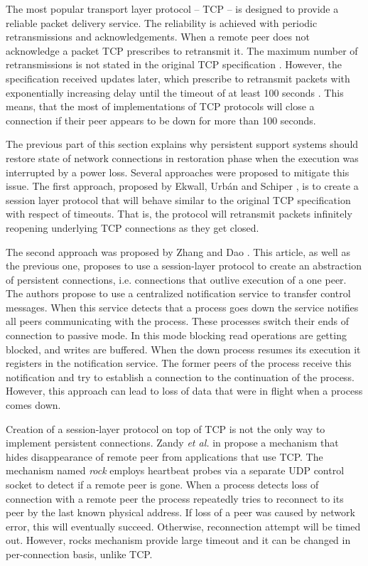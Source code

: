 The most popular transport layer protocol -- TCP -- is designed to provide a 
reliable packet delivery service. The reliability is achieved with periodic
retransmissions and acknowledgements. When a remote peer does not acknowledge a
packet TCP prescribes to retransmit it. The maximum number of retransmissions is
not stated in the original TCP specification \cite{john1981transmission}.
However, the specification received updates later, which prescribe to retransmit
packets with exponentially increasing delay \cite{rfc6298} until the timeout of
at least 100 seconds \cite{rfc1122}. This means, that the most of
implementations of TCP protocols will close a connection if their peer appears
to be down for more than 100 seconds.

The previous part of this section explains why persistent support systems should
restore state of network connections in restoration phase when the execution was
interrupted by a power loss. Several approaches were proposed to mitigate this
issue. The first approach, proposed by Ekwall, Urb{\'a}n and Schiper
\cite{ekwall2002robust}, is to create a session layer protocol that will behave
similar to the original TCP specification with respect of timeouts. That is, the
protocol will retransmit packets infinitely reopening underlying TCP connections
as they get closed.

The second approach was proposed by Zhang and Dao \cite{zhang1995persistent}.
This article, as well as the previous one, proposes to use a session-layer
protocol to create an abstraction of persistent connections, i.e. connections
that outlive execution of a one peer. The authors propose to use a centralized
notification service to transfer control messages. When this service detects
that a process goes down the service notifies all peers communicating with the
process. These processes switch their ends of connection to passive mode. In
this mode blocking read operations are getting blocked, and writes are buffered.
When the down process resumes its execution it registers in the notification
service. The former peers of the process receive this notification and try to
establish a connection to the continuation of the process. However, this
approach can lead to loss of data that were in flight when a process comes down.

Creation of a session-layer protocol on top of TCP is not the only way to
implement persistent connections. Zandy \textit{et al.} in \cite{rocks_racks}
propose a mechanism that hides disappearance of remote peer from applications
that use TCP. The mechanism named \textit{rock} employs heartbeat probes via a
separate UDP control socket to detect if a remote peer is gone. When a process
detects loss of connection with a remote peer the process repeatedly tries to
reconnect to its peer by the last known physical address. If loss of a peer was
caused by network error, this will eventually succeed. Otherwise, reconnection
attempt will be timed out. However, rocks mechanism provide large timeout and it
can be changed in per-connection basis, unlike TCP. 

